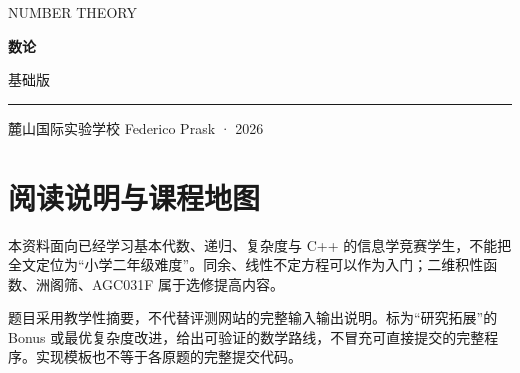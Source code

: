 \documentclass[UTF8,a4paper,11pt,oneside,openany,fontset=fandol]{ctexbook}
\theoremstyle{definition}
\begin{document}
\frontmatter
\begin{titlepage}
\setlength{\parindent}{0pt}
\vspace*{1.2cm}
{\large\color{accent}NUMBER THEORY}\par
\vspace{1cm}
{\fontsize{46}{56}\selectfont\bfseries\color{ink}数论}\par
\vspace{0.5cm}
{\Large 基础版}\par
\vspace{0.5cm}
{\color{accent}\rule{\textwidth}{1.2pt}}\par
\vspace{0.3cm}
\begin{minipage}{0.9\textwidth}
\large 麓山国际实验学校 Federico Prask · 2026
\end{minipage}\par
\vfill
{\normalsize }\par
{\small}
\end{titlepage}
\chapter*{阅读说明与课程地图}

\begin{pitfall}[适用范围与阅读边界]
本资料面向已经学习基本代数、递归、复杂度与 C++ 的信息学竞赛学生，不能把全文定位为“小学二年级难度”。同余、线性不定方程可以作为入门；二维积性函数、洲阁筛、AGC031F 属于选修提高内容。

题目采用教学性摘要，不代替评测网站的完整输入输出说明。标为“研究拓展”的 Bonus 或最优复杂度改进，给出可验证的数学路线，不冒充可直接提交的完整程序。实现模板也不等于各原题的完整提交代码。
\end{pitfall}
\end{document}
